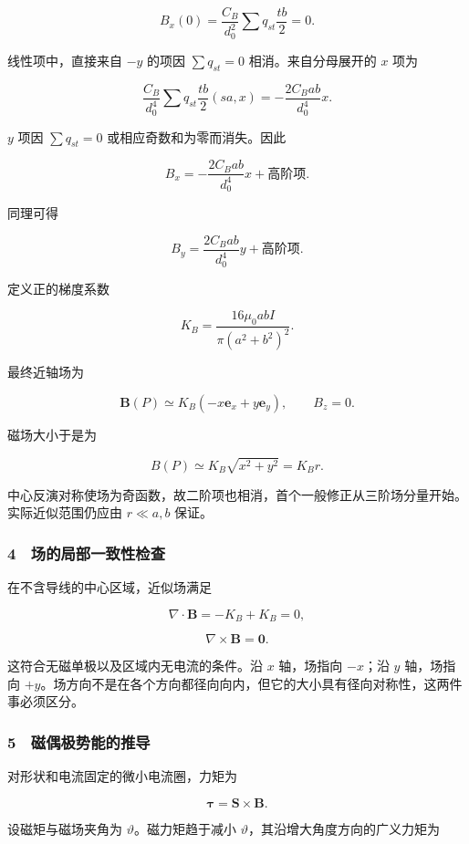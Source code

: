 \documentclass[12pt,a4paper,fontset=fandol]{ctexart}
\begin{document}
\[B_x(0)=\frac{C_B}{d_0^2}\sum q_{st}\frac{tb}{2}=0.\]

线性项中，直接来自 \(-y\) 的项因 \(\sum q_{st}=0\) 相消。来自分母展开的
\(x\) 项为

\[\frac{C_B}{d_0^4}
\sum q_{st}\frac{tb}{2}(sa,x)
=-\frac{2C_Bab}{d_0^4}x.\]

\(y\) 项因 \(\sum q_{st}=0\) 或相应奇数和为零而消失。因此

\[B_x=-\frac{2C_Bab}{d_0^4}x+\text{高阶项}.\]

同理可得

\[B_y=\frac{2C_Bab}{d_0^4}y+\text{高阶项}.\]

定义正的梯度系数

\[\boxed{K_B=\frac{16\mu_0abI}{\pi(a^2+b^2)^2}.}\]

最终近轴场为

\[\boxed{\boldsymbol B(P)
\simeq K_B(-x\boldsymbol e_x+y\boldsymbol e_y),
\qquad B_z=0.}\]

磁场大小于是为

\[\boxed{B(P)\simeq K_B\sqrt{x^2+y^2}=K_Br.}\]

中心反演对称使场为奇函数，故二阶项也相消，首个一般修正从三阶场分量开始。实际近似范围仍应由
\(r\ll a,b\) 保证。

\subsubsection{4　场的局部一致性检查}\label{ux573aux7684ux5c40ux90e8ux4e00ux81f4ux6027ux68c0ux67e5}

在不含导线的中心区域，近似场满足

\[\nabla\cdot\boldsymbol B
=-K_B+K_B=0,\]

\[\nabla\times\boldsymbol B=\boldsymbol0.\]

这符合无磁单极以及区域内无电流的条件。沿 \(x\) 轴，场指向 \(-x\)；沿
\(y\) 轴，场指向
\(+y\)。场方向不是在各个方向都径向向内，但它的大小具有径向对称性，这两件事必须区分。

\subsubsection{5　磁偶极势能的推导}\label{ux78c1ux5076ux6781ux52bfux80fdux7684ux63a8ux5bfc}

对形状和电流固定的微小电流圈，力矩为

\[\boldsymbol\tau=\boldsymbol S\times\boldsymbol B.\]

设磁矩与磁场夹角为 \(\vartheta\)。磁力矩趋于减小
\(\vartheta\)，其沿增大角度方向的广义力矩为
\end{document}
